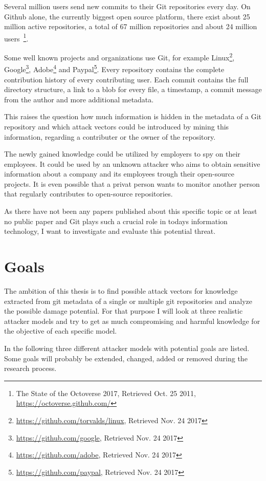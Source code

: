 Several million users send new commits to their Git repositories every day.
On Github alone, the currently biggest open source platform, there exist about 25 million active repositories, a total of 67 million repositories and about 24 million users~\footnote{The State of the Octoverse 2017, Retrieved Oct. 25 2011, \url{https://octoverse.github.com/}}.

Some well known projects and organizations use Git, for example Linux\footnote{\url{https://github.com/torvalds/linux}, Retrieved Nov. 24 2017}, Google\footnote{\url{https://github.com/google}, Retrieved Nov. 24 2017}, Adobe\footnote{\url{https://github.com/adobe}, Retrieved Nov. 24 2017} and Paypal\footnote{\url{https://github.com/paypal}, Retrieved Nov. 24 2017}.
Every repository contains the complete contribution history of every contributing user.
Each commit contains the full directory structure, a link to a blob for every file, a timestamp, a commit message from the author and more additional metadata.

This raises the question how much information is hidden in the metadata of a Git repository and which attack vectors could be introduced by mining this information, regarding a contributer or the owner of the repository.

The newly gained knowledge could be utilized by employers to spy on their employees.
It could be used by an unknown attacker who aims to obtain sensitive information about a company and its employees trough their open-source projects.
It is even possible that a privat person wants to monitor another person that regularly contributes to open-source repositories.


As there have not been any papers published about this specific topic or at least no public paper and Git plays such a crucial role in todays information technology, I want to investigate and evaluate this potential threat.


\chapter{Goals}

The ambition of this thesis is to find possible attack vectors for knowledge extracted from git metadata of a single or multiple git repositories and analyze the possible damage potential.
For that purpose I will look at three realistic attacker models and try to get as much compromising and harmful knowledge for the objective of each specific model.

In the following three different attacker models with potential goals are listed.
Some goals will probably be extended, changed, added or removed during the research process.

